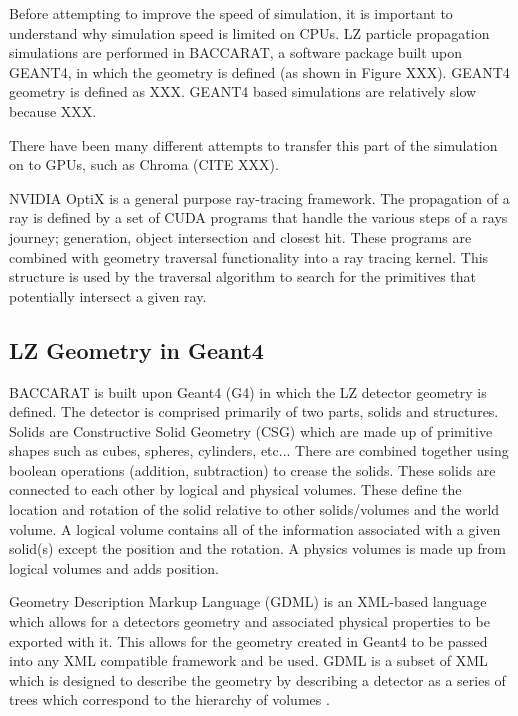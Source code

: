 \par
Before attempting to improve the speed of simulation, it is important to understand why simulation speed is limited on CPUs. 
LZ particle propagation simulations are performed in BACCARAT, a software package built upon GEANT4, in which the geometry is defined (as shown in Figure XXX).
GEANT4 geometry is defined as XXX.
GEANT4 based simulations are relatively slow because XXX.

There have been many different attempts to transfer this part of the simulation on to GPUs, such as Chroma (CITE XXX).



\par
NVIDIA OptiX is a general purpose ray-tracing framework.
The propagation of a ray is defined by a set of CUDA programs that handle the various steps of a rays journey; generation, object intersection and closest hit.
These programs are combined with geometry traversal functionality into a ray tracing kernel. 
This structure is used by the traversal algorithm to search for the primitives that potentially intersect a given ray.



\subsection{LZ Geometry in Geant4}
\par
BACCARAT is built upon Geant4 (G4) in which the LZ detector geometry is defined.
The detector is comprised primarily of two parts, solids and structures.
Solids are Constructive Solid Geometry (CSG) which are made up of primitive shapes such as cubes, spheres, cylinders, etc...
There are combined together using boolean operations (addition, subtraction) to crease the solids.
These solids are connected to each other by logical and physical volumes.
These define the location and rotation of the solid relative to other solids/volumes and the world volume.
A logical volume contains all of the information associated with a given solid(s) except the position and the rotation.
A physics volumes is made up from logical volumes and adds position.

\par
Geometry Description Markup Language (GDML) is an XML-based language which allows for a detectors geometry and associated physical properties to be exported with it.
This allows for the geometry created in Geant4 to be passed into any XML compatible framework and be used.
GDML is a subset of XML which is designed to describe the geometry by describing a detector as a series of trees which correspond to the hierarchy of volumes \cite{GDML_USER_GUIDE_ref}.

